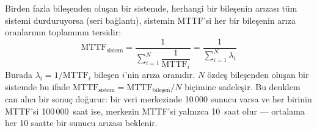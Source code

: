 Birden fazla bileşenden oluşan bir sistemde, herhangi bir bileşenin arızası tüm sistemi durduruyorsa (seri bağlantı), sistemin MTTF'si her bir bileşenin arıza oranlarının toplamının tersidir:
%
\begin{equation}
\text{MTTF}_{\text{sistem}} = \frac{1}{\displaystyle\sum_{i=1}^{N} \dfrac{1}{\text{MTTF}_i}} = \frac{1}{\displaystyle\sum_{i=1}^{N} \lambda_i}
\label{eq:mttf-sistem}
\end{equation}
%
Burada $\lambda_i = 1/\text{MTTF}_i$ bileşen $i$'nin arıza oranıdır. $N$ özdeş bileşenden oluşan bir sistemde bu ifade $\text{MTTF}_{\text{sistem}} = \text{MTTF}_{\text{bileşen}} / N$ biçimine sadeleşir. Bu denklem can alıcı bir sonuç doğurur: bir veri merkezinde 10\,000 sunucu varsa ve her birinin MTTF'si 100\,000~saat ise, merkezin MTTF'si yalnızca 10~saat olur --- ortalama her 10 saatte bir sunucu arızası beklenir.

